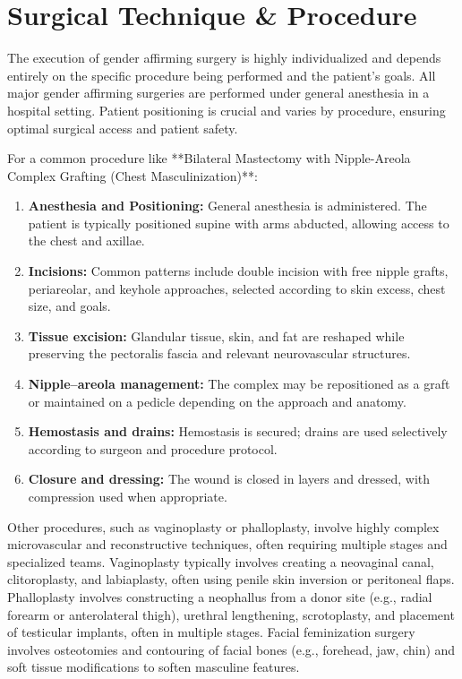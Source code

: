 \section*{Surgical Technique \& Procedure}
The execution of gender affirming surgery is highly individualized and depends entirely on the specific procedure being performed and the patient's goals. All major gender affirming surgeries are performed under general anesthesia in a hospital setting. Patient positioning is crucial and varies by procedure, ensuring optimal surgical access and patient safety.

For a common procedure like **Bilateral Mastectomy with Nipple-Areola Complex Grafting (Chest Masculinization)**:

\begin{enumerate}
  \item  \textbf{Anesthesia and Positioning:} General anesthesia is administered. The patient is typically positioned supine with arms abducted, allowing access to the chest and axillae.
  \item \textbf{Incisions:} Common patterns include double incision with free nipple grafts, periareolar, and keyhole approaches, selected according to skin excess, chest size, and goals.
  \item \textbf{Tissue excision:} Glandular tissue, skin, and fat are reshaped while preserving the pectoralis fascia and relevant neurovascular structures.
  \item \textbf{Nipple--areola management:} The complex may be repositioned as a graft or maintained on a pedicle depending on the approach and anatomy.
  \item \textbf{Hemostasis and drains:} Hemostasis is secured; drains are used selectively according to surgeon and procedure protocol.
  \item \textbf{Closure and dressing:} The wound is closed in layers and dressed, with compression used when appropriate.
\end{enumerate}

Other procedures, such as vaginoplasty or phalloplasty, involve highly complex microvascular and reconstructive techniques, often requiring multiple stages and specialized teams. Vaginoplasty typically involves creating a neovaginal canal, clitoroplasty, and labiaplasty, often using penile skin inversion or peritoneal flaps. Phalloplasty involves constructing a neophallus from a donor site (e.g., radial forearm or anterolateral thigh), urethral lengthening, scrotoplasty, and placement of testicular implants, often in multiple stages. Facial feminization surgery involves osteotomies and contouring of facial bones (e.g., forehead, jaw, chin) and soft tissue modifications to soften masculine features.

